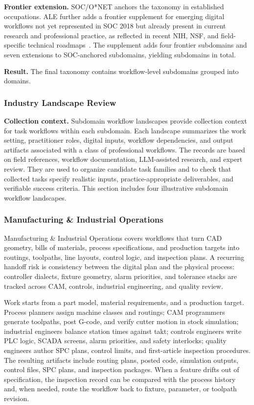 \noindent \textbf{Frontier extension.}
SOC/O*NET anchors the taxonomy in established occupations. ALE further adds a frontier supplement
for emerging digital workflows not yet represented in SOC 2018 but already present in current
research and professional practice, as reflected in recent NIH, NSF, and field-specific technical
roadmaps~\citep{nih2021strategicplan,nsb2024sei,uschips2022,nsfchips2024,nist2023airmf}.
The supplement adds four frontier subdomains and seven extensions to SOC-anchored subdomains,
yielding \taskcount{} subdomains in total.

\noindent \textbf{Result.}
The final taxonomy contains \taskcount{} workflow-level subdomains grouped into \clustercount{}
domains.

\subsubsection{Industry Landscape Review}
\label{app:industry-landscape}

\noindent \textbf{Collection context.}
Subdomain workflow landscapes provide collection context for task workflows within each subdomain.
Each landscape summarizes the work setting, practitioner roles, digital inputs, workflow
dependencies, and output artifacts associated with a class of professional workflows. The records
are based on field references, workflow documentation, LLM-assisted research, and expert
review. They are used to organize candidate task families and to check that collected tasks specify
realistic inputs, practice-appropriate deliverables, and verifiable success criteria. This section
includes four illustrative subdomain workflow landscapes.

\subsubsection{Manufacturing \& Industrial Operations}
Manufacturing \& Industrial Operations covers workflows that turn CAD geometry, bills of materials,
process specifications, and production targets into routings, toolpaths, line layouts, control logic,
and inspection plans. A recurring handoff risk is consistency between the digital plan and the physical
process: controller dialects, fixture geometry, alarm priorities, and tolerance stacks are tracked
across CAM, controls, industrial engineering, and quality review.

Work starts from a part model, material requirements, and a production target. Process planners
assign machine classes and routings; CAM programmers generate toolpaths, post G-code, and verify
cutter motion in stock simulation; industrial engineers balance station times against takt; controls
engineers write PLC logic, SCADA screens, alarm priorities, and safety interlocks; quality engineers
author SPC plans, control limits, and first-article inspection procedures. The resulting artifacts
include routing plans, posted code, simulation outputs, control files, SPC plans, and inspection
packages. When a feature drifts out of specification, the inspection record can be compared with the
process history and, when needed, route the workflow back to fixture, parameter, or toolpath
revision.

